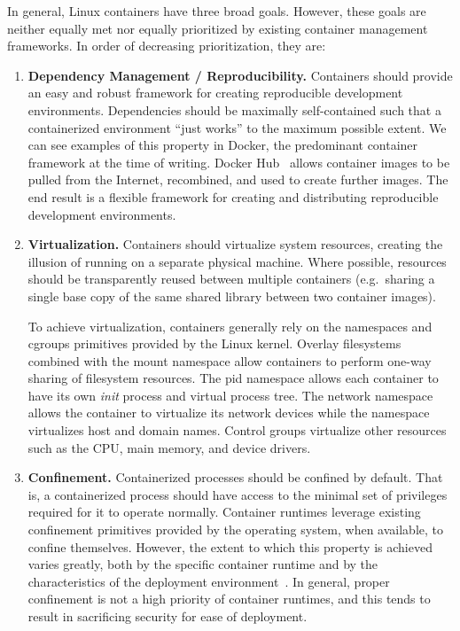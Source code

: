 In general, Linux containers have three broad goals. However, these goals are neither
equally met nor equally prioritized by existing container management frameworks. In order
of decreasing prioritization, they are:
\begin{enumerate}[font=\bfseries]
  \item \textbf{Dependency Management / Reproducibility.}
    Containers should provide an easy and robust framework for creating reproducible
    development environments. Dependencies should be maximally self-contained such that
    a containerized environment \enquote{just works} to the maximum possible extent. We
    can see examples of this property in Docker, the predominant container framework at
    the time of writing. Docker Hub~\cite{docker_hub} allows container images to be pulled
    from the Internet, recombined, and used to create further images. The end result is
    a flexible framework for creating and distributing reproducible development
    environments.

  \item \textbf{Virtualization.}
    Containers should virtualize system resources, creating the illusion of running on
    a separate physical machine. Where possible, resources should be transparently reused
    between multiple containers (e.g.~sharing a single base copy of the same shared
    library between two container images).

    To achieve virtualization, containers generally rely on the namespaces and cgroups
    primitives provided by the Linux kernel.  Overlay filesystems~\cite{overlayfs}
    combined with the mount namespace allow containers to perform one-way sharing of
    filesystem resources. The \gls{pid} namespace allows each container to have its own
    \textit{init} process and virtual process tree.  The network namespace allows the
    container to virtualize its network devices while the  namespace
    virtualizes host and domain names. Control groups virtualize other resources such as
    the CPU, main memory, and device drivers.

  \item \textbf{Confinement.}
    Containerized processes should be confined by default. That is, a containerized
    process should have access to the minimal set of privileges required for it to operate
    normally. Container runtimes leverage existing confinement primitives provided by the
    operating system, when available, to confine themselves. However, the extent to which
    this property is achieved varies greatly, both by the specific container runtime and
    by the characteristics of the deployment
    environment~\cite{sultan2019_container_security, lin2018_container_security,
    bui2015_docker_analysis}. In general, proper confinement is not a high priority of
    container runtimes, and this tends to result in sacrificing security for ease of
    deployment.
\end{enumerate}

